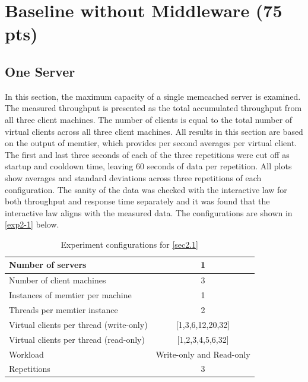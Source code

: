 \documentclass[11pt,a4paper]{article}
\begin{document}
\section{Baseline without Middleware (75 pts)} \label{section2}

\subsection{One Server} \label{sec2.1}

In this section, the maximum capacity of a single memcached server is examined. The measured throughput is presented as the total accumulated throughput from all three client machines. The number of clients is equal to the total number of virtual clients across all three client machines. All results in this section are based on the output of memtier, which provides per second averages per virtual client. The first and last three seconds of each of the three repetitions were cut off as startup and cooldown time, leaving 60 seconds of data per repetition. All plots show averages and standard deviations across three repetitions of each configuration. The sanity of the data was checked with the interactive law for both throughput and response time separately and it was found that the interactive law aligns with the measured data. The configurations are shown in \autoref{exp2-1} below.

\begin{table}
    \centering
	\begin{tabular}{|l|c|}
		\hline Number of servers                        & 1                                 \\ 
		\hline Number of client machines                & 3                                 \\ 
		\hline Instances of memtier per machine         & 1                                 \\ 
		\hline Threads per memtier instance             & 2                                 \\
		\hline Virtual clients per thread (write-only)  & [1,3,6,12,20,32]                  \\ 
		\hline Virtual clients per thread (read-only)   & [1,2,3,4,5,6,32]                  \\ 
		\hline Workload                                 & Write-only and Read-only          \\
		\hline Repetitions                              & 3                                 \\ 
		\hline 
	\end{tabular}
	\caption{Experiment configurations for \autoref{sec2.1}} \label{exp2-1}
\end{table}
\end{document}
